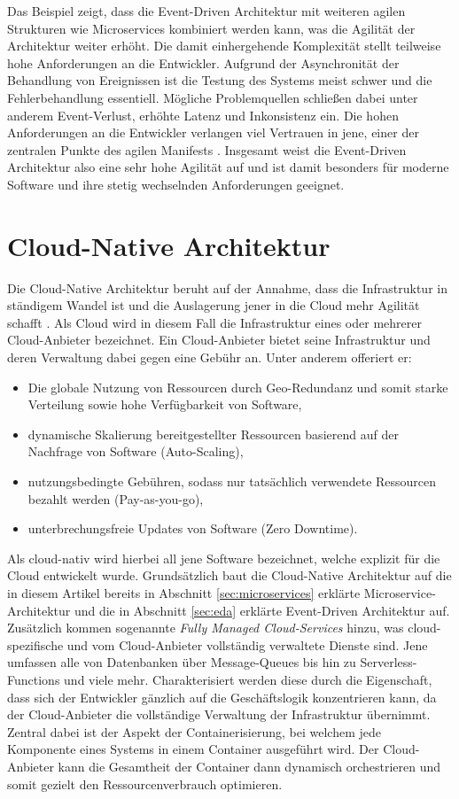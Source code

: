 \documentclass[acmtog]{acmart}
\begin{document}
Das Beispiel zeigt, dass die Event-Driven Architektur mit weiteren agilen Strukturen wie Microservices kombiniert werden kann, was die Agilität der Architektur weiter erhöht.
Die damit einhergehende Komplexität stellt teilweise hohe Anforderungen an die Entwickler.
Aufgrund der Asynchronität der Behandlung von Ereignissen ist die Testung des Systems meist schwer und die Fehlerbehandlung essentiell.
Mögliche Problemquellen schließen dabei unter anderem Event-Verlust, erhöhte Latenz und Inkonsistenz ein.
Die hohen Anforderungen an die Entwickler verlangen viel Vertrauen in jene, einer der zentralen Punkte des agilen Manifests \cite{agileManifesto}.
Insgesamt weist die Event-Driven Architektur also eine sehr hohe Agilität auf und ist damit besonders für moderne Software und ihre stetig wechselnden Anforderungen geeignet.

\section{Cloud-Native Architektur}
\label{sec:cloudnative}
Die Cloud-Native Architektur beruht auf der Annahme, dass die Infrastruktur in ständigem Wandel ist und die Auslagerung jener in die Cloud mehr Agilität schafft \cite{cloudNative}.
Als Cloud wird in diesem Fall die Infrastruktur eines oder mehrerer Cloud-Anbieter bezeichnet.
Ein Cloud-Anbieter bietet seine Infrastruktur und deren Verwaltung dabei gegen eine Gebühr an.
Unter anderem offeriert er:
\begin{itemize}
  \item Die globale Nutzung von Ressourcen durch Geo-Redundanz und somit starke Verteilung sowie hohe Verfügbarkeit von Software,
  \item dynamische Skalierung bereitgestellter Ressourcen basierend auf der Nachfrage von Software (Auto-Scaling),
  \item nutzungsbedingte Gebühren, sodass nur tatsächlich verwendete Ressourcen bezahlt werden (Pay-as-you-go),
  \item unterbrechungsfreie Updates von Software (Zero Downtime).
\end{itemize}

Als cloud-nativ wird hierbei all jene Software bezeichnet, welche explizit für die Cloud entwickelt wurde.
Grundsätzlich baut die Cloud-Native Architektur auf die in diesem Artikel bereits in Abschnitt \ref{sec:microservices} erklärte Microservice-Architektur und die
in Abschnitt \ref{sec:eda} erklärte Event-Driven Architektur auf.
Zusätzlich kommen sogenannte \textit{Fully Managed Cloud-Services} hinzu, was cloud-spezifische und vom Cloud-Anbieter vollständig verwaltete Dienste sind.
Jene umfassen alle von Datenbanken über Message-Queues bis hin zu Serverless-Functions und viele mehr.
Charakterisiert werden diese durch die Eigenschaft, dass sich der Entwickler gänzlich auf die Geschäftslogik konzentrieren kann, da der Cloud-Anbieter
die vollständige Verwaltung der Infrastruktur übernimmt.
Zentral dabei ist der Aspekt der Containerisierung, bei welchem jede Komponente eines Systems in einem Container ausgeführt wird.
Der Cloud-Anbieter kann die Gesamtheit der Container dann dynamisch orchestrieren und somit gezielt den Ressourcenverbrauch optimieren.
\end{document}
